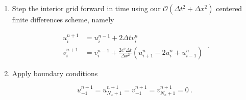\documentclass[a4paper,11pt]{article}
\begin{document}
\begin{enumerate}
\begin{enumerate}
    \item Step the interior grid forward in time using our $\mathcal{O}\left(\Delta t^{2} + \Delta x^{2}\right)$ centered finite differences scheme, namely

$$
\boxed{
\begin{aligned}
u^{n+1}_{i} &= u^{n-1}_{i} + 2\Delta t v^{n}_{i}\\
v^{n+1}_{i} &= v^{n-1}_{i} + \frac{2c^{2}\Delta t}{\Delta x^{2}}\left(u^{n}_{i+1}-2u^{n}_{i}+u^{n}_{i-1}\right)
\end{aligned}
}\ .
$$

    \item Apply boundary conditions

$$
\boxed{u^{n+1}_{-1} = u^{n+1}_{N_{x}+1} = v^{n+1}_{-1} = v^{n+1}_{N_{x}+1} = 0}\ .
$$
  \end{enumerate}
\end{enumerate}
\end{document}

